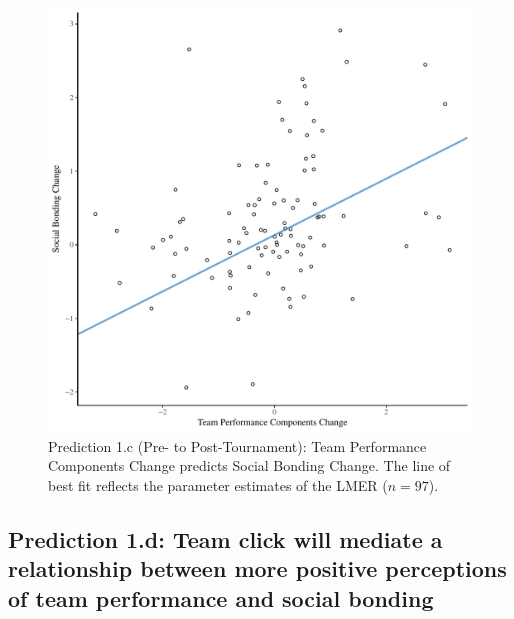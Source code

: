 \begin{CJK}{UTF8}{gbsn}




  \begin{figure}[htbp]
    \centering
  \includegraphics[scale=.5]{images/jasBondDeltaModelSlope.pdf}
    \caption{Prediction 1.c (Pre- to Post-Tournament): Team Performance Components Change predicts Social Bonding Change. The line of best fit reflects the parameter estimates of the LMER ($n = 97$).}
    \label{fig:jasBondDeltaModelSlope}
  \end{figure}








\subsection{Prediction 1.d: Team click will mediate a relationship between more positive perceptions of team performance and social bonding}



\end{CJK}

